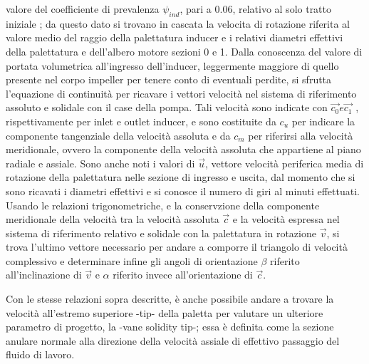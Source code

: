 valore del coefficiente di prevalenza $\psi_{ind}$, pari a $0.06$, relativo al solo tratto iniziale \cite{AIAA_book_1}; da questo dato si trovano in cascata la velocita di rotazione riferita al valore medio del raggio della palettatura inducer e i relativi diametri effettivi della palettatura e dell'albero motore sezioni 0 e 1. Dalla conoscenza del valore di portata volumetrica all'ingresso dell'inducer, leggermente maggiore di quello presente nel corpo impeller per tenere conto di eventuali perdite, si sfrutta l'equazione di continuità per ricavare i vettori velocità nel sistema di riferimento assoluto e solidale con il case della pompa. Tali velocità sono indicate con $\overrightarrow{c_0} e \overrightarrow{c_1}$ , rispettivamente per inlet e outlet inducer, e sono costituite da $c_u$ per indicare la componente tangenziale della velocità assoluta e da $c_m$ per riferirsi alla velocità meridionale, ovvero la componente della velocità assoluta che appartiene al piano radiale e assiale. Sono anche noti i valori di $\overrightarrow{u}$, vettore velocità periferica media di rotazione della palettatura nelle sezione di ingresso e uscita, dal momento che si sono ricavati i diametri effettivi e si conosce il numero di giri al minuti effettuati. Usando le relazioni trigonometriche, e la conservzione della componente meridionale della velocità tra la velocità assoluta $\overrightarrow{c}$ e la velocità espressa nel sistema di riferimento relativo e solidale con la palettatura in rotazione $\overrightarrow{v}$, si trova l'ultimo vettore necessario per andare a comporre il triangolo di velocità complessivo e determinare infine gli angoli di orientazione $\beta$ riferito all'inclinazione di  $\overrightarrow{v}$ e $\alpha$ riferito invece all'orientazione di $\overrightarrow{c}$.

Con le stesse relazioni sopra descritte, è anche possibile andare a trovare la velocità all'estremo superiore -tip- della paletta per valutare un ulteriore parametro di progetto, la -vane solidity tip-; essa è definita come la sezione anulare normale alla direzione della velocità assiale di effettivo passaggio del fluido di lavoro.
\\

